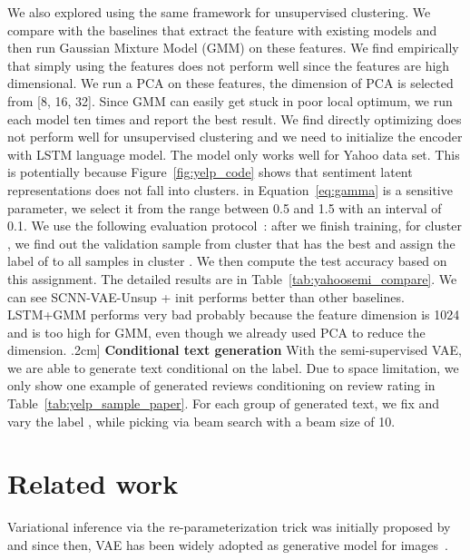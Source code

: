 \documentclass{article}
\begin{document}
We also explored using the same framework for unsupervised
clustering. We compare with the baselines that extract the feature with
existing models and then run Gaussian Mixture Model (GMM) on these features. We
find empirically that simply using the features does not perform well since the
features are high dimensional. We run a PCA on these features, the dimension of
PCA is selected from [8, 16, 32]. Since GMM can easily get stuck in poor local
optimum, we run each model ten times and report the best result.
We find directly optimizing  does not perform well for unsupervised
clustering and we need to initialize the encoder with LSTM language model. The
model only works well for Yahoo data set. This is potentially because
Figure~\ref{fig:yelp_code} shows that sentiment latent representations does
not fall into clusters.  in Equation~\ref{eq:gamma} is a sensitive parameter,
we select it from the range between 0.5 and 1.5 with an interval of 0.1.
We use the following evaluation protocol~\cite{makhzani2015adversarial}: after we
finish training, for cluster , we find out the validation sample  from cluster 
that has the best  and assign the label of  to all samples in
cluster . We then compute the test accuracy based on this assignment.
The detailed results are in Table~\ref{tab:yahoosemi_compare}. We can see
SCNN-VAE-Unsup + init performs better than other baselines. LSTM+GMM performs very
bad probably because the feature dimension is 1024 and is too high for
GMM, even though we already used PCA to reduce the dimension.
\0.2cm]
{\bf Conditional text generation}
With the semi-supervised VAE, we are able to generate text conditional on the
label. Due to space limitation, we only show one example of generated reviews
conditioning on review rating in Table~\ref{tab:yelp_sample_paper}.
For
each group of generated text, we fix  and vary the label , while picking  via beam search with a beam size of 10.

\section{Related work}
Variational inference via the re-parameterization trick was initially proposed
by~\cite{kingma2013auto, rezende2014stochastic} and since then, VAE has been
widely adopted as generative model for images~\cite{gregor2015draw,
  yan2016attribute2image, salimans2015markov, gregor2016towards, hu2017unifying}.
\end{document}
